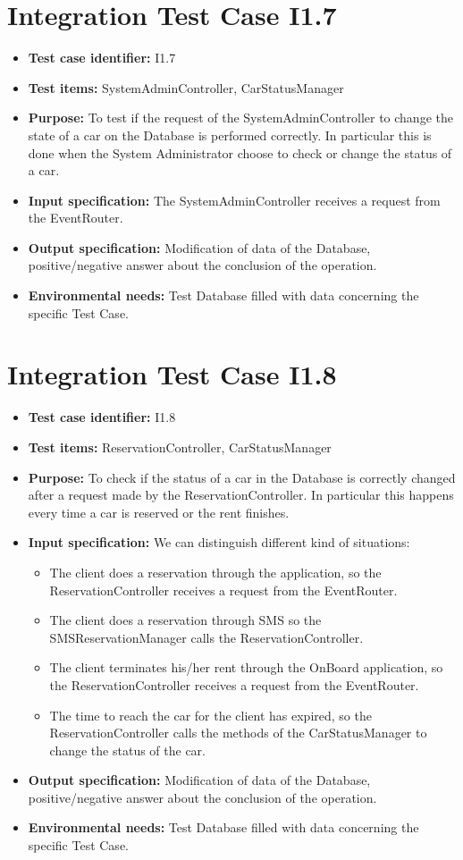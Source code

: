 \section{Integration Test Case I1.7}
\begin{itemize}
\item \textbf{Test case identifier:} I1.7
\item \textbf{Test items:} SystemAdminController, CarStatusManager
\item \textbf{Purpose:} To test if the request of the SystemAdminController to change the state of a car on the Database is performed correctly. In particular this is done when the System Administrator choose to check or change the status of a car.
\item \textbf{Input specification:} The SystemAdminController receives a request from the EventRouter.
\item \textbf{Output specification:} Modification of data of the Database, positive/negative answer about the conclusion of the operation.
\item \textbf{Environmental needs:} Test Database filled with data concerning the specific Test Case.
\end{itemize}

\section{Integration Test Case I1.8}
\begin{itemize}
\item \textbf{Test case identifier:} I1.8
\item \textbf{Test items:} ReservationController, CarStatusManager
\item \textbf{Purpose:} To check if the status of a car in the Database is correctly changed after a request made by the ReservationController. In particular this happens every time a car is reserved or the rent finishes.
\item \textbf{Input specification:} We can distinguish different kind of situations:
\begin{itemize}
\item The client does a reservation through the application, so the ReservationController receives a request from the EventRouter.
\item The client does a reservation through SMS so the SMSReservationManager calls the ReservationController.
\item The client terminates his/her rent through the OnBoard application, so the ReservationController receives a request from the EventRouter.
\item The time to reach the car for the client has expired, so the ReservationController calls the methods of the CarStatusManager to change the status of the car.
\end{itemize}
\item \textbf{Output specification:} Modification of data of the Database, positive/negative answer about the conclusion of the operation.
\item \textbf{Environmental needs:} Test Database filled with data concerning the specific Test Case.
\end{itemize}

